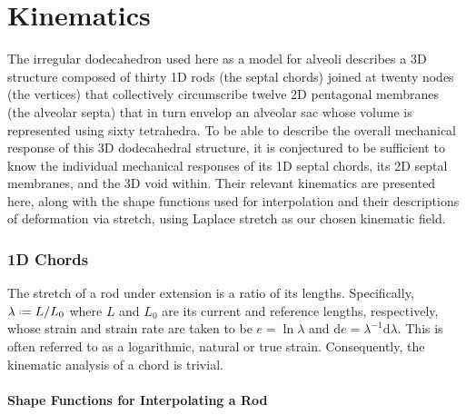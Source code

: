 \part{Kinematics}
\label{partKinematics}

The irregular dodecahedron used here as a model for alveoli describes a 3D structure composed of thirty 1D rods (the septal chords) joined at twenty nodes (the vertices) that collectively circumscribe twelve 2D pentagonal membranes (the alveolar septa) that in turn envelop an alveolar sac whose volume is represented using sixty tetrahedra.  To be able to describe the overall mechanical response of this 3D dodecahedral structure, it is conjectured to be sufficient to know the individual mechanical responses of its 1D septal chords, its 2D septal membranes, and the 3D void within.  Their relevant kinematics are presented here, along with the shape functions used for interpolation and their descriptions of deformation via stretch, using Laplace stretch \cite{Freedetal20} as our chosen kinematic field.

\section{1D Chords}

The stretch of a rod under extension is a ratio of its lengths.  Specifically, $\lambda \defeq L / L_0$ where $L$ and $L_0$ are its current and reference lengths, respectively, whose strain and strain rate are taken to be $e = \ln \lambda$ and $\mathrm{d} e = \lambda^{-1} \mathrm{d} \lambda$.  This is often referred to as a logarithmic, natural or true strain.  Consequently, the kinematic analysis of a chord is trivial.

\subsection{Shape Functions for Interpolating a Rod}

